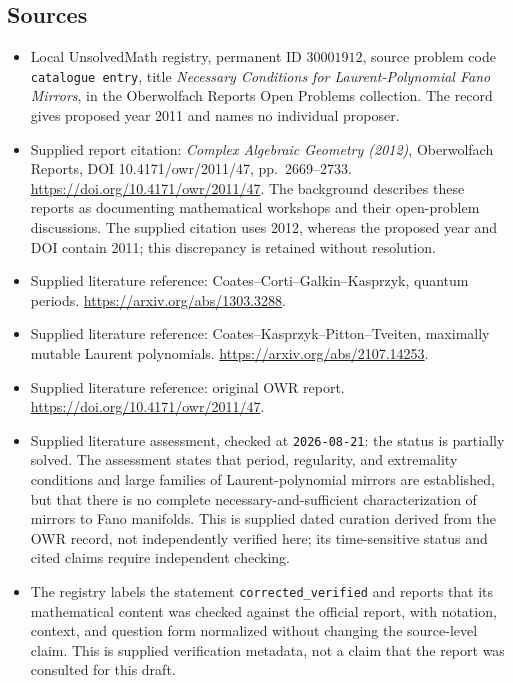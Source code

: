 \documentclass[11pt]{article}
\begin{document}
\subsection{Sources}
\begin{itemize}
\item Local UnsolvedMath registry, permanent ID \(30001912\), source problem code \texttt{catalogue entry}, title \emph{Necessary Conditions for Laurent-Polynomial Fano Mirrors}, in the Oberwolfach Reports Open Problems collection. The record gives proposed year 2011 and names no individual proposer.
\item Supplied report citation: \emph{Complex Algebraic Geometry (2012)}, Oberwolfach Reports, DOI 10.4171/owr/2011/47, pp.\ 2669--2733. \url{https://doi.org/10.4171/owr/2011/47}. The background describes these reports as documenting mathematical workshops and their open-problem discussions. The supplied citation uses 2012, whereas the proposed year and DOI contain 2011; this discrepancy is retained without resolution.
\item Supplied literature reference: Coates--Corti--Galkin--Kasprzyk, quantum periods. \url{https://arxiv.org/abs/1303.3288}.
\item Supplied literature reference: Coates--Kasprzyk--Pitton--Tveiten, maximally mutable Laurent polynomials. \url{https://arxiv.org/abs/2107.14253}.
\item Supplied literature reference: original OWR report. \url{https://doi.org/10.4171/owr/2011/47}.
\item Supplied literature assessment, checked at \texttt{2026-08-21}: the status is partially solved. The assessment states that period, regularity, and extremality conditions and large families of Laurent-polynomial mirrors are established, but that there is no complete necessary-and-sufficient characterization of mirrors to Fano manifolds. This is supplied dated curation derived from the OWR record, not independently verified here; its time-sensitive status and cited claims require independent checking.
\item The registry labels the statement \texttt{corrected\_verified} and reports that its mathematical content was checked against the official report, with notation, context, and question form normalized without changing the source-level claim. This is supplied verification metadata, not a claim that the report was consulted for this draft.
\end{itemize}
\end{document}
